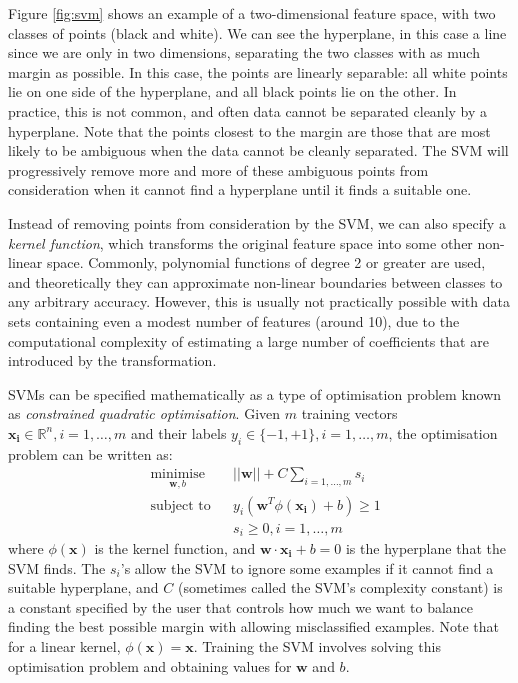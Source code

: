 Figure \ref{fig:svm} shows an example of a two-dimensional feature space, with
two classes of points (black and white). We can see the hyperplane, in this
case a line since we are only in two dimensions, separating the two classes
with as much margin as possible. In
this case, the points are linearly separable: all white points lie on one side
of the hyperplane, and all black points lie on the other. In practice, this is
not common, and often data cannot be separated cleanly by a hyperplane.
Note that the points closest to the margin are those that are most likely to be
ambiguous when the data cannot be cleanly separated. The SVM will progressively
remove more and more of these ambiguous points from consideration when it
cannot find a hyperplane until it finds a suitable one.

Instead of removing points from consideration by the SVM, we can also specify
a \textit{kernel function}, which transforms the original feature space into
some other non-linear space. Commonly, polynomial functions of degree 2 or
greater are used, and theoretically they can approximate non-linear boundaries
between classes to any arbitrary accuracy. However, this is usually not
practically possible with data sets containing even a modest number of features
(around 10), due to the computational complexity of estimating a large number
of coefficients that are introduced by the transformation.

SVMs can be specified mathematically as a type of optimisation problem known
as \textit{constrained quadratic optimisation}. Given $m$ training vectors
$\mathbf{x_i} \in \mathbb{R}^n, i=1,\ldots,m$ and their labels
$y_i \in \{-1,+1\}, i=1,\ldots,m$, the optimisation problem can be written as:
\begin{equation*}
\begin{aligned}
& \underset{\mathbf{w},b}{\mathrm{minimise}}
  && ||\mathbf{w}|| + C\sum_{i=1,\ldots,m} s_i \\
& \text{subject to}
  && y_i(\mathbf{w}^T\phi(\mathbf{x_i})+b) \geq 1 \\
& && s_i \geq 0, i = 1,\ldots,m
\end{aligned}
\end{equation*}
where $\phi(\mathbf{x})$ is the kernel function, and
$\mathbf{w}\cdot\mathbf{x_i} + b = 0$ is the hyperplane that the SVM finds.
The $s_i$'s allow the SVM to ignore some examples if it cannot find a suitable
hyperplane, and $C$ (sometimes called the SVM's complexity constant) is a
constant specified by the user that controls how much we want to balance
finding the best possible margin with allowing misclassified examples.
Note that for a linear kernel, $\phi(\mathbf{x}) = \mathbf{x}$. Training the
SVM involves solving this optimisation problem and obtaining values for
$\mathbf{w}$ and $b$.

